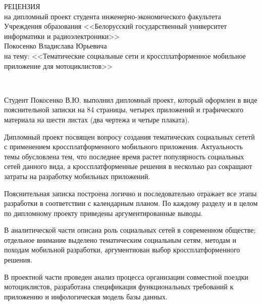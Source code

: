 
\thispagestyle{empty}

\begin{singlespace}

{\small
  \begin{center}
    \begin{minipage}{0.9\textwidth}
      \begin{center}
        {\normalsize РЕЦЕНЗИЯ}\\[0.2cm]
        на дипломный проект студента инженерно-экономического факультета Учреждения образования <<Белорусский государственный университет информатики и радиоэлектроники>>\\
        Покосенко Владислава Юрьевича \\
        на тему: <<Тематические социальные сети и кроссплатформенное мобильное приложение для мотоциклистов>>
      \end{center}
    \end{minipage}\\
  \end{center}

Студент Покосенко В.Ю. выполнил дипломный проект, который оформлен в виде пояснительной записки на 84 страницы, четырех приложений и графического материала на шести листах (два чертежа и четыре плаката).

Дипломный проект посвящен вопросу создания тематических социальных сететй с применением кроссплатформенного мобильного приложения. Актуальность темы обусловлена тем, что последнее время растет популярность социальных сетей данного вида, а кроссплатформенные решения в несколько раз сокращают затраты на разработку мобильных приложений.

Пояснительная записка построена логично и последовательно отражает все этапы разработки в соответствии с календарным планом. По каждому разделу и в целом по дипломному проекту приведены аргументированные выводы.

В аналитической части описана роль социальных сетей в современном обществе; отдельное внимание выделено тематическим социальным сетям, методам и походам мобильной разработки, аргументиован выбор кроссплатформенного решения.

В проектной части проведен анализ процесса организации совместной поездки мотоциклистов, разработана спецификация функциональных требований к приложению и инфологическая модель базы данных.

}
\end{singlespace}
